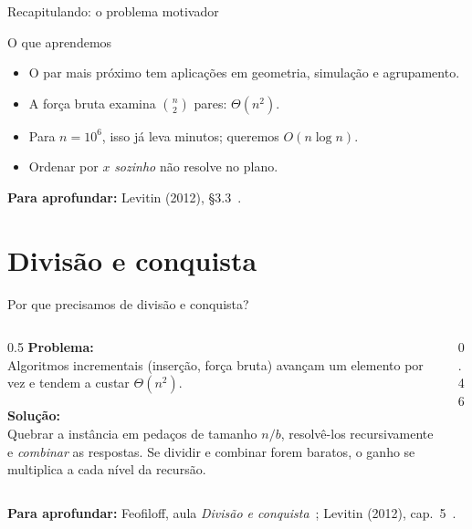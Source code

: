 \documentclass[aspectratio=169,xcolor=table]{beamer}
\newcommand{\fonte}[1]{%
  \vfill
  {\tiny\color{gray!55!black}\textbf{Para aprofundar:} #1\par}%
}
\begin{document}
\begin{frame}{Recapitulando: o problema motivador}
  \begin{block}{O que aprendemos}
    \begin{itemize}\small
      \item O par mais próximo tem aplicações em geometria, simulação e agrupamento.
      \item A força bruta examina $\binom{n}{2}$ pares: $\Theta(n^2)$.
      \item Para $n=10^6$, isso já leva minutos; queremos $O(n\log n)$.
      \item Ordenar por $x$ \emph{sozinho} não resolve no plano.
    \end{itemize}
  \end{block}
  \fonte{Levitin (2012), \S 3.3~\cite{levitin2012introduction}.}
\end{frame}

\section{Divisão e conquista}

\begin{frame}{Por que precisamos de divisão e conquista?}
  \begin{columns}[T]
    \begin{column}{0.5\textwidth}
      \textbf{Problema:}\\[2pt]
      {\scriptsize Algoritmos incrementais (inserção, força bruta) avançam
      um elemento por vez e tendem a custar $\Theta(n^2)$.}

      \medskip
      \textbf{Solução:}\\[2pt]
      {\scriptsize Quebrar a instância em pedaços de tamanho $n/b$,
      resolvê-los recursivamente e \emph{combinar} as respostas. Se dividir
      e combinar forem baratos, o ganho se multiplica a cada nível da
      recursão.}
    \end{column}
    \begin{column}{0.46\textwidth}
      \centering
    \end{column}
  \end{columns}
  \fonte{Feofiloff, aula \emph{Divisão e conquista}~\cite{feofiloff2026analise};
    Levitin (2012), cap.~5~\cite{levitin2012introduction}.}
\end{frame}
\end{document}
